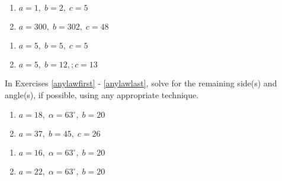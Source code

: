 \begin{multicols}{2} 

\begin{enumerate}

\setcounter{enumi}{\value{HW}}

\item $a = 1, \; b = 2, \; c = 5$
\item $a = 300, \; b = 302, \; c = 48$ \label{secondherons}

\setcounter{HW}{\value{enumi}}

\end{enumerate}

\end{multicols}

\begin{multicols}{2} 

\begin{enumerate}

\setcounter{enumi}{\value{HW}}

\item $a = 5, \; b = 5, \; c = 5$
\item $a = 5, \; b = 12,; c = 13$ \label{thirdherons} \label{lastlawofcosines}

\setcounter{HW}{\value{enumi}}

\end{enumerate}

\end{multicols}

In Exercises \ref{anylawfirst} - \ref{anylawlast}, solve for the remaining side(s) and angle(s), if possible, using any appropriate technique.

\begin{multicols}{2}

\begin{enumerate}

\setcounter{enumi}{\value{HW}}

\item $a = 18, \; \alpha = 63^{\circ}, \; b = 20$ \label{ambigfirst} \label{anylawfirst}
\item $a = 37, \; b = 45, \; c = 26$

\setcounter{HW}{\value{enumi}}

\end{enumerate}

\end{multicols}

\begin{multicols}{2} 

\begin{enumerate}

\setcounter{enumi}{\value{HW}}

\item $a = 16, \; \alpha = 63^{\circ}, \; b = 20$ \label{ambigsecond}
\item $a = 22, \; \alpha = 63^{\circ}, \; b = 20$ \label{ambigthird}

\setcounter{HW}{\value{enumi}}

\end{enumerate}

\end{multicols}

